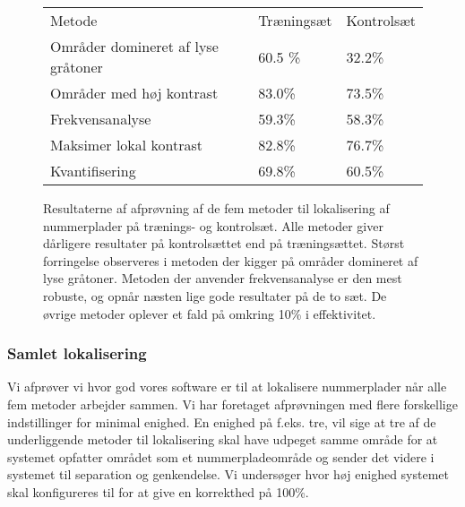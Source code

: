 \begin{figure}[htp]
\centering
\begin{tabular}{|l|l|l|}
\hline
\rowcolor[gray]{0.9} \multicolumn{3}{|>{\columncolor[gray]{0.9}}c|}{\textbf{Individuelle metoder til lokalisering}} \\ \hline
Metode & Træningsæt & Kontrolsæt\\ \hline
Områder domineret af lyse gråtoner &  60.5 \% & 32.2\%\\ \hline
Områder med høj kontrast & 83.0\% & 73.5\%\\ \hline
Frekvensanalyse &  59.3\% & 58.3\%\\ \hline
Maksimer lokal kontrast &  82.8\% & 76.7\%\\ \hline
Kvantifisering &  69.8\% & 60.5\%\\
\hline
\end{tabular}
\caption{Resultaterne af afprøvning af de fem metoder til lokalisering af nummerplader på trænings- og kontrolsæt. Alle metoder giver dårligere resultater på kontrolsættet end på træningsættet. Størst forringelse observeres i metoden der kigger på områder domineret af lyse gråtoner. Metoden der anvender frekvensanalyse er den mest robuste, og opnår næsten lige gode resultater på de to sæt. De øvrige metoder oplever et fald på omkring 10\% i effektivitet.}
\label{fig:test:lokalisering_traening_kontrol}
\end{figure}


\subsubsection{Samlet lokalisering}
Vi afprøver vi hvor god vores software er til at lokalisere nummerplader når alle fem metoder arbejder sammen. Vi har foretaget afprøvningen med flere forskellige indstillinger for minimal enighed. En enighed på f.eks. tre, vil sige at tre af de underliggende metoder til lokalisering skal have udpeget samme område for at systemet opfatter området som et nummerpladeområde og sender det videre i systemet til separation og genkendelse. Vi undersøger hvor høj enighed systemet skal konfigureres til for at give en korrekthed på 100\%.

